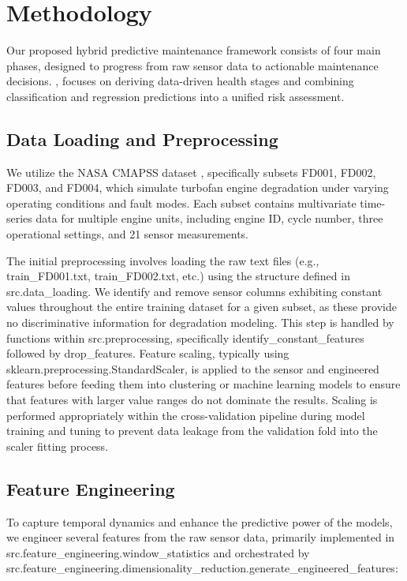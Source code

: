 \section{Methodology}
\label{sec:methodology}

Our proposed hybrid predictive maintenance framework consists of four main phases, designed to progress from raw sensor data to actionable maintenance decisions. , focuses on deriving data-driven health stages and combining classification and regression predictions into a unified risk assessment.

\subsection{Data Loading and Preprocessing}
\label{subsec:data_preprocessing}
We utilize the NASA CMAPSS dataset \cite{cmapss_data, saxena2008damage}, specifically subsets FD001, FD002, FD003, and FD004, which simulate turbofan engine degradation under varying operating conditions and fault modes. Each subset contains multivariate time-series data for multiple engine units, including engine ID, cycle number, three operational settings, and 21 sensor measurements.

The initial preprocessing involves loading the raw text files (e.g., train\_FD001.txt, train\_FD002.txt, etc.) using the structure defined in src.data\_loading. We identify and remove sensor columns exhibiting constant values throughout the entire training dataset for a given subset, as these provide no discriminative information for degradation modeling. This step is handled by functions within src.preprocessing, specifically identify\_constant\_features followed by drop\_features. Feature scaling, typically using sklearn.preprocessing.StandardScaler, is applied to the sensor and engineered features before feeding them into clustering or machine learning models to ensure that features with larger value ranges do not dominate the results. Scaling is performed appropriately within the cross-validation pipeline during model training and tuning to prevent data leakage from the validation fold into the scaler fitting process.

\subsection{Feature Engineering}
\label{subsec:feature_engineering}
To capture temporal dynamics and enhance the predictive power of the models, we engineer several features from the raw sensor data, primarily implemented in src.feature\_engineering.window\_statistics and orchestrated by src.feature\_engineering.dimensionality\_reduction.generate\_engineered\_features:


